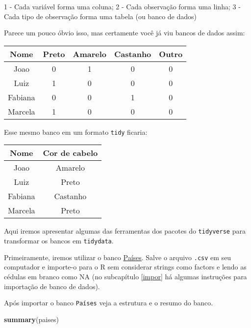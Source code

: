\documentclass[]{book}
\newenvironment{Shaded}{\begin{snugshade}}{\end{snugshade}}
\newcommand{\KeywordTok}[1]{\textcolor[rgb]{0.13,0.29,0.53}{\textbf{#1}}}
\newcommand{\NormalTok}[1]{#1}
\theoremstyle{definition}
\theoremstyle{definition}
\theoremstyle{definition}
\theoremstyle{remark}
\begin{document}
1 - Cada variável forma uma coluna;
2 - Cada observação forma uma linha;
3 - Cada tipo de observação forma uma tabela (ou banco de dados)

Parece um pouco óbvio isso, mas certamente você já viu bancos de dados assim:

\begin{longtable}[]{@{}ccccc@{}}
\toprule
Nome & Preto & Amarelo & Castanho & Outro\tabularnewline
\midrule
\endhead
Joao & 0 & 1 & 0 & 0\tabularnewline
Luiz & 1 & 0 & 0 & 0\tabularnewline
Fabiana & 0 & 0 & 1 & 0\tabularnewline
Marcela & 1 & 0 & 0 & 0\tabularnewline
\bottomrule
\end{longtable}

Esse mesmo banco em um formato \texttt{tidy} ficaria:

\begin{longtable}[]{@{}cc@{}}
\toprule
Nome & Cor de cabelo\tabularnewline
\midrule
\endhead
Joao & Amarelo\tabularnewline
Luiz & Preto\tabularnewline
Fabiana & Castanho\tabularnewline
Marcela & Preto\tabularnewline
\bottomrule
\end{longtable}

Aqui iremos apresentar algumas das ferramentas dos pacotes do \texttt{tidyverse} para transformar os bancos em \texttt{tidydata}.

Primeiramente, iremos utilizar o banco \href{https://raw.githubusercontent.com/ipassos/material-introR/master/banco.csv}{Países}. Salve o arquivo \texttt{.csv} em seu computador e importe-o para o R sem considerar strings como factors e lendo as cédulas em branco como NA (no subcapítulo \ref{impor} há algumas instruções para importação de banco de dados).

Após importar o banco \texttt{Países} veja a estrutura e o resumo do banco.

\begin{Shaded}
\begin{Highlighting}[]
\KeywordTok{summary}\NormalTok{(paises)}
\end{Highlighting}
\end{Shaded}
\end{document}
